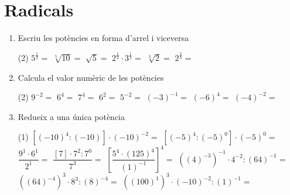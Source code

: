 \documentclass[a4paper]{article}
\begin{document}
    \section{Radicals}
       \begin{enumerate}[resume]
      \item Escriu les potències en forma d'arrel i viceversa
      \begin{tasks}(2)
        \task $5^{\frac{1}{2}}={}$
        \task $ \sqrt[5]{10}={}$
        \task $ \sqrt{5}={}$
        \task $2^{\frac{1}{2}} \cdot 3^{\frac{1}{2}}={}$
        \task $ \sqrt[3]{2}={}$
        \task $2^{\frac{2}{3}}={}$
      \end{tasks}
      \item Calcula el valor numèric de les potències
      \begin{tasks}(2)
        \task $9^{-2}={}$
        \task $6^{4}={}$
        \task $7^{4}={}$
        \task $6^{2}={}$
        \task $5^{-2}={}$
        \task $\left( -3\right)^{-1}={}$
        \task $\left( -6\right)^{4}={}$
        \task $\left( -4\right)^{-2}={}$
      \end{tasks}
      \item Redueix a una única potència
      \begin{tasks}(1)
        \task $\left[\left(-10\right)^{4} : \left(-10\right) \right] \cdot \left(-10\right)^{-2}={}$
        \task $\left[\left(-5\right)^{4} : \left(-5\right)^{0} \right] \cdot \left(-5\right)^{0}={}$
        \task $\dfrac{ 9^{1} \cdot 6^{1} }{2^{1}}={}$
        \task $\dfrac{ \left[ 7\right]  \cdot 7^{2} : 7^{0}}{7^{3}}={}$
        \task $\left[ \dfrac{5^{4}\cdot \left( 125 \right)^{4}}{\left( 1 \right)^{-1}} \right]^{4}={}$
        \task $\left(\left( 4 \right)^{-3} \right)^{-1} \cdot 4^{-2} : \left( 64 \right)^{-1}={}$
        \task $\left(\left( 64 \right)^{-4} \right)^{3} \cdot 8^{3} : \left( 8 \right)^{-4}={}$
        \task $\left(\left( 100 \right)^{1} \right)^{3} \cdot \left(-10\right)^{-2} : \left( 1 \right)^{-1}={}$
      \end{tasks}
  \par \noindent \vspace{0.25cm} 
  \vspace{0.25cm}
  

\end{enumerate}
\end{document}
